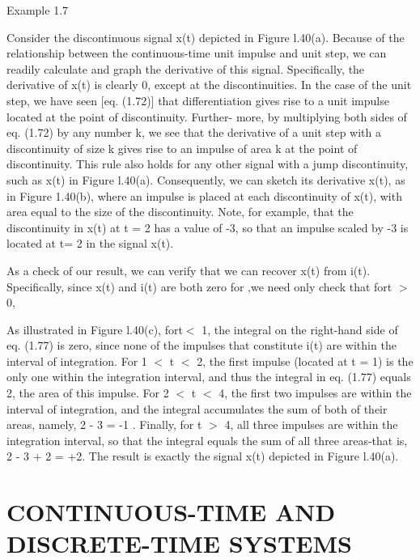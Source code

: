 \documentclass{report}
\begin{document}
Example 1.7

Consider the discontinuous signal x(t) depicted in Figure l.40(a). Because of the relationship between the continuous-time unit impulse and unit
step, we can readily calculate and graph the derivative of this signal. Specifically, the derivative of x(t) is clearly 0, except at the discontinuities.
In the case of the unit step, we have seen [eq. (1.72)] that differentiation gives rise to a unit impulse located at the point of discontinuity.
Further- more, by multiplying both sides of eq. (1.72) by any number k, we see that the derivative of a unit step with a discontinuity of size k
gives rise to an impulse of area k at the point of discontinuity. This rule also holds for any other signal with a jump discontinuity, such as x(t)
in Figure l.40(a). Consequently, we can sketch its derivative x(t), as in Figure 1.40(b), where an impulse is placed at each discontinuity of x(t),
with area equal to the size of the discontinuity. Note, for example, that the discontinuity in x(t) at t = 2 has a value of -3, so that an impulse
scaled by -3 is located at t= 2 in the signal x(t).

As a check of our result, we can verify that we can recover x(t) from i(t). Specifically, since x(t) and i(t) are both zero for { } { } ,we need
only check that fort $>$ 0,



As illustrated in Figure l.40(c), fort$<$ 1, the integral on the right-hand side of eq. (1.77) is zero, since none of the impulses that constitute
i(t) are within the interval of integration. For 1 $<$ t $<$ 2, the first impulse (located at t = 1) is the only one within the integration interval,
and thus the integral in eq. (1.77) equals 2, the area of this impulse. For 2 $<$ t $<$ 4, the first two impulses are within the interval of integration,
and the integral accumulates the sum of both of their areas, namely, 2 - 3 = -1 . Finally, for t $>$ 4, all three impulses are within the integration
interval, so that the integral equals the sum of all three areas-that is, 2 - 3 + 2 = +2. The result is exactly the signal x(t) depicted in Figure
l.40(a).

\section*{CONTINUOUS-TIME AND DISCRETE-TIME SYSTEMS}
\end{document}
